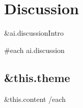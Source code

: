 \section{Discussion}

{{&ai.discussionIntro}}

{{#each ai.discussion}}
	\subsection{ {{&this.theme}} }
	{{&this.content}}
{{/each}}






